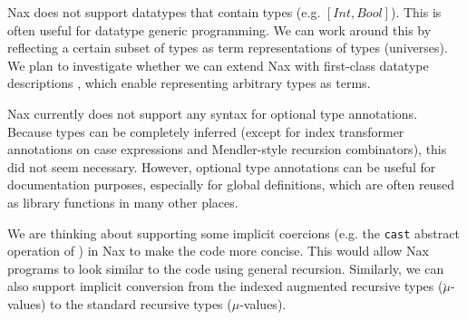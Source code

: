Nax does not support datatypes that contain types (e.g. $[Int,Bool]$). This
is often useful
for datatype generic programming. We can work around this
by reflecting a certain subset of types as term representations of types
(universes). 
We plan to investigate whether we can extend Nax with
first-class datatype descriptions \cite{DagMcb12}, which
enable representing arbitrary types as terms.

Nax currently does not support any syntax for optional type annotations.
Because types can be completely inferred (except for index transformer
annotations on case expressions and Mendler-style recursion combinators), this
did not seem necessary.
However, optional type annotations can be useful for documentation purposes,
especially for global definitions, which are often reused as library functions
in many other places.

We are thinking about supporting some implicit coercions (e.g. the {\tt cast}
abstract operation of \MPr) in Nax to make the code more concise.
This would allow Nax programs to look similar
to the code using general recursion.  Similarly,
we can also support implicit conversion from the indexed augmented
recursive types ($\breve{\mu}$-values) to the standard recursive types
($\mu$-values).

